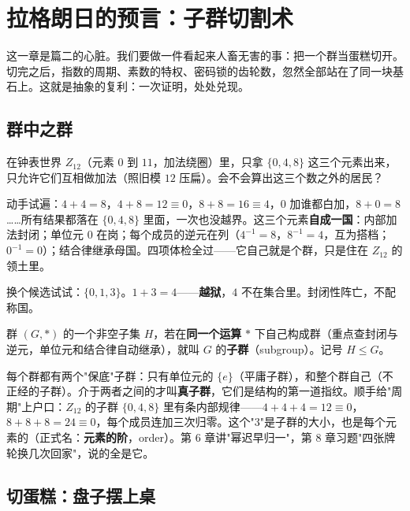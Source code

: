 \chapter{拉格朗日的预言：子群切割术}

这一章是篇二的心脏。我们要做一件看起来人畜无害的事：把一个群当蛋糕切开。切完之后，指数的周期、素数的特权、密码锁的齿轮数，忽然全部站在了同一块基石上。这就是抽象的复利：一次证明，处处兑现。

\section{群中之群}

\begin{kaiwei}
在钟表世界 $Z_{12}$（元素 $0$ 到 $11$，加法绕圈）里，只拿 $\{0, 4, 8\}$ 这三个元素出来，只允许它们互相做加法（照旧模 $12$ 压扁）。会不会算出这三个数之外的居民？
\end{kaiwei}

动手试遍：$4+4 = 8$，$4+8 = 12\equiv 0$，$8+8 = 16\equiv 4$，$0$ 加谁都白加，$8+0 = 8$……所有结果都落在 $\{0, 4, 8\}$ 里面，一次也没越界。这三个元素\textbf{自成一国}：内部加法封闭；单位元 $0$ 在岗；每个成员的逆元在列（$4^{-1} = 8$，$8^{-1} = 4$，互为搭档；$0^{-1} = 0$）；结合律继承母国。四项体检全过——它自己就是个群，只是住在 $Z_{12}$ 的领土里。

换个候选试试：$\{0, 1, 3\}$。$1 + 3 = 4$——\textbf{越狱}，$4$ 不在集合里。封闭性阵亡，不配称国。

\begin{dingyi}[子群]
群 $(G, *)$ 的一个非空子集 $H$，若在\textbf{同一个运算} $*$ 下自己构成群（重点查封闭与逆元，单位元和结合律自动继承），就叫 $G$ 的\textbf{子群}（subgroup）。记号 $H \le G$。
\end{dingyi}

每个群都有两个"保底"子群：只有单位元的 $\{e\}$（平庸子群），和整个群自己（不正经的子群）。介于两者之间的才叫\textbf{真子群}，它们是结构的第一道指纹。顺手给"周期"上户口：$Z_{12}$ 的子群 $\{0,4,8\}$ 里有条内部规律——$4+4+4 = 12\equiv 0$，$8+8+8 = 24\equiv0$，每个成员连加三次归零。这个"$3$"是子群的大小，也是每个元素的（正式名：\textbf{元素的阶}，order）。第 6 章讲"幂迟早归一"，第 8 章习题"四张牌轮换几次回家"，说的全是它。

\section{切蛋糕：盘子摆上桌}

